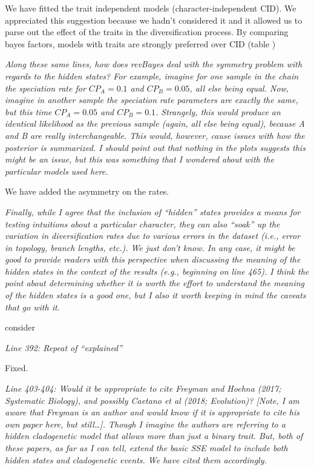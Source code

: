 \documentclass[11pt]{article}
\renewenvironment{quote}{\bigskip\noindent\itshape\ignorespaces}{\smallskip}
\begin{document}
We have fitted the trait independent models (character-independent CID). We appreciated this suggestion because  we hadn't considered it and it allowed us to parse out the effect of the traits in the diversification process. By comparing bayes factors, models with traits are strongly preferred over CID (table )

\begin{quote}
Along these same lines, how does revBayes deal with the symmetry problem with regards to the hidden states?
For example, imagine for one sample in the chain the speciation rate for $CP_A=0.1$ and $CP_B=0.05$, all else being equal.
Now, imagine in another sample the speciation rate parameters are exactly the same, but this time $CP_A=0.05$ and $CP_B=0.1$. 
Strangely, this would produce an identical likelihood as the previous sample (again, all else being equal), because A and B are really interchangeable.
This would, however, cause issues with how the posterior is summarized.
I should point out that nothing in the plots suggests this might be an issue, but this was something that I wondered about with the particular models used here.
\end{quote}

We have added the asymmetry on the rates. %

\begin{quote}
Finally, while I agree that the inclusion of ``hidden'' states provides a means for testing intuitions about a particular character, they can also ``soak'' up the variation in diversification rates due to various errors in the dataset (i.e., error in topology, branch lengths, etc.).
We just don't know.
In any case, it might be good to provide readers with this perspective when discussing the meaning of the hidden states in the context of the results (e.g., beginning on line 465).
I think the point about determining whether it is worth the effort to understand the meaning of the hidden states is a good one, but I also it worth keeping in mind the caveats that go with it.
\end{quote}

consider %


\begin{quote}
Line 392: Repeat of ``explained''
\end{quote}

Fixed.

\begin{quote}
Line 403-404: Would it be appropriate to cite Freyman and Hoehna (2017; Systematic Biology), and possibly Caetano et al (2018; Evolution)?
[Note, I am aware that Freyman is an author and would know if it is appropriate to cite his own paper here, but still\ldots]. 
Though I imagine the authors are referring to a hidden cladogenetic model that allows more than just a binary trait.
But, both of these papers, as far as I can tell, extend the basic SSE model to include both hidden states and cladogenetic events.
\end{quote}
We have cited them accordingly. %
\end{document}
